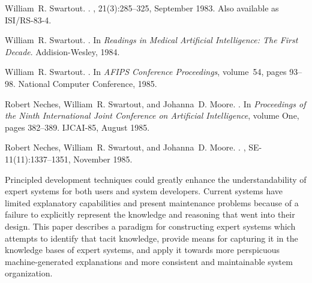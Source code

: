 \begin{thebibliography}{10}



William~R. Swartout.
.
, 21(3):285--325, September 1983.
\newblock Also available as ISI/RS-83-4.

\noindent\hspace*{\itemindent}{\leftskip=0.1in\rightskip=0.1in\hrulefill}

William~R. Swartout.
.
\newblock In {\em Readings in Medical Artificial Intelligence: The First
  Decade}. Addision-Wesley, 1984.

\noindent\hspace*{\itemindent}{\leftskip=0.1in\rightskip=0.1in\hrulefill}

William~R. Swartout.
.
\newblock In {\em AFIPS Conference Proceedings}, volume~54, pages 93--98.
  National Computer Conference, 1985.

\noindent\hspace*{\itemindent}{\leftskip=0.1in\rightskip=0.1in\hrulefill}

Robert Neches, William~R. Swartout, and Johanna~D. Moore.
.
\newblock In {\em Proceedings of the Ninth International Joint Conference on
  Artificial Intelligence}, volume One, pages 382--389. IJCAI-85, August 1985.

\noindent\hspace*{\itemindent}{\leftskip=0.1in\rightskip=0.1in\hrulefill}

Robert Neches, William~R. Swartout, and Johanna~D. Moore.
.
,
  SE-11(11):1337--1351, November 1985.

{\leftskip=0.1in\rightskip=0.1in\begin{small}\par{}Principled development techniques could greatly enhance the
understandability of expert systems for both users and system developers. 
Current systems have limited explanatory capabilities and present
maintenance problems because of a failure to explicitly represent the
knowledge and reasoning that went into their design.  This paper describes
a paradigm for constructing expert systems which attempts to identify that
tacit knowledge, provide means for capturing it in the knowledge bases of
expert systems, and apply it towards more perspicuous machine-generated
explanations and more consistent and maintainable system organization.
  \end{small}\par}
\noindent\hspace*{\itemindent}{\leftskip=0.1in\rightskip=0.1in\hrulefill}



\end{thebibliography}
